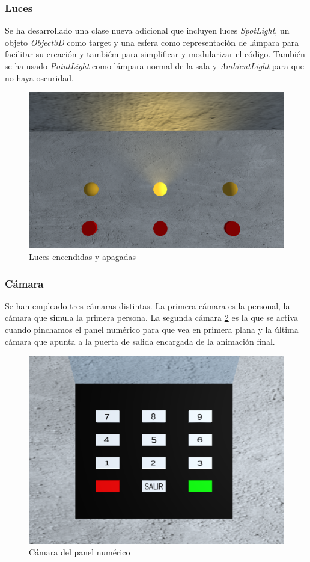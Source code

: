 \subsubsection{Luces}
Se ha desarrollado una clase nueva adicional que incluyen luces \textit{SpotLight}, un objeto \textit{Object3D} como target y una esfera como representación de lámpara para facilitar su creación y tambiém para simplificar y modularizar el código. También se ha usado \textit{PointLight} como lámpara normal de la sala y \textit{AmbientLight} para que no haya oscuridad.

\begin{figure}[H]
  \centering
  \includegraphics[scale=0.2]{luces}
  \caption{Luces encendidas y apagadas}
  \label{fig:luces}
\end{figure}

\subsubsection{Cámara}
Se han empleado tres cámaras distintas. La primera cámara es la personal, la cámara que simula la primera persona. La segunda cámara \ref{fig:camara} es la que se activa cuando pinchamos el panel numérico para que vea en primera plana y la última cámara que apunta a la puerta de salida encargada de la animación final.

\begin{figure}[H]
  \centering
  \includegraphics[scale=0.2]{camara}
  \caption{Cámara del panel numérico}
  \label{fig:camara}
\end{figure}

